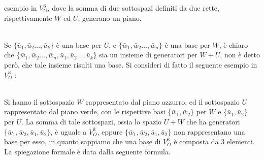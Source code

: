\documentclass[12pt, letterpaper]{article}
\begin{document}
esempio in \(V^3_O\), dove la somma di due sottospazi definiti da due rette, rispettivamente 
\(W\) ed \(U\), generano un piano.\begin{figure}[h]
    \end{figure}\\
Se \(\{\bar u_1,\bar u_2\dots,\bar u_k\}\) è una base per \(U\), e 
\(\{\bar w_1,\bar w_2\dots,\bar w_n\}\) è una base per \(W\), è chiaro che 
\(\{\bar w_1,\bar w_2\dots,\bar w_n,\bar u_1,\bar u_2\dots,\bar u_k\}\) sia un insieme 
di generatori per \(W+U\), non è detto però, che tale insieme risulti una base. Si consideri 
di fatto il seguente esempio in \(V_O^3\) :
\begin{figure}[h]
\end{figure}
\\Si hanno il sottospazio \(W\) rappresentato dal piano azzurro, ed il sottospazio \(U\) rappresentato 
dal piano verde, con le rispettive basi \(\{\bar w_1,\bar w_2\}\) per \(W\) e 
\(\{\bar u_1,\bar u_2\}\) per \(U\). La somma di 
tale sottospazi, ossia lo spazio \(U+W\) che ha generatori \(\{\bar w_1,\bar w_2,\bar u_1,\bar u_2\}\), 
è uguale a \(V_O^3\), eppure  \(\{\bar w_1,\bar w_2,\bar u_1,\bar u_2\}\) non rappresentano una base 
per esso, in quanto sappiamo che una base di \(V_O^3\) è composta da 3 elementi. La spiegazione formale è 
data dalla seguente formula.
\end{document}
